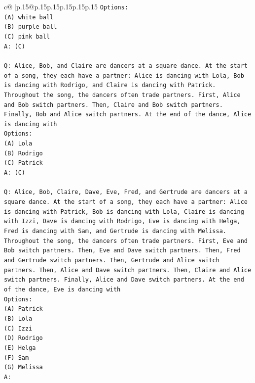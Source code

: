 \documentclass{article}
\begin{document}
{\begin{supertabular}{c@{$\;$}|p{.15\linewidth}@{}p{.15\linewidth}p{.15\linewidth}p{.15\linewidth}p{.15\linewidth}p{.15\linewidth}}
{{{\texttt{Options:} \\
\texttt{(A) white ball} \\
\texttt{(B) purple ball} \\
\texttt{(C) pink ball} \\
\texttt{A: (C)} \\
\\ 
\texttt{Q: Alice, Bob, and Claire are dancers at a square dance. At the start of a song, they each have a partner: Alice is dancing with Lola, Bob is dancing with Rodrigo, and Claire is dancing with Patrick.} \\
\texttt{Throughout the song, the dancers often trade partners. First, Alice and Bob switch partners. Then, Claire and Bob switch partners. Finally, Bob and Alice switch partners. At the end of the dance, Alice is dancing with} \\
\texttt{Options:} \\
\texttt{(A) Lola} \\
\texttt{(B) Rodrigo} \\
\texttt{(C) Patrick} \\
\texttt{A: (C)} \\
\\ 
\texttt{Q: Alice, Bob, Claire, Dave, Eve, Fred, and Gertrude are dancers at a square dance. At the start of a song, they each have a partner: Alice is dancing with Patrick, Bob is dancing with Lola, Claire is dancing with Izzi, Dave is dancing with Rodrigo, Eve is dancing with Helga, Fred is dancing with Sam, and Gertrude is dancing with Melissa.} \\
\texttt{Throughout the song, the dancers often trade partners. First, Eve and Bob switch partners. Then, Eve and Dave switch partners. Then, Fred and Gertrude switch partners. Then, Gertrude and Alice switch partners. Then, Alice and Dave switch partners. Then, Claire and Alice switch partners. Finally, Alice and Dave switch partners. At the end of the dance, Eve is dancing with} \\
\texttt{Options:} \\
\texttt{(A) Patrick} \\
\texttt{(B) Lola} \\
\texttt{(C) Izzi} \\
\texttt{(D) Rodrigo} \\
\texttt{(E) Helga} \\
\texttt{(F) Sam} \\
\texttt{(G) Melissa} \\
\texttt{A:} \\
            }
        }
    }
     \\ \\


\end{supertabular}}
\end{document}
